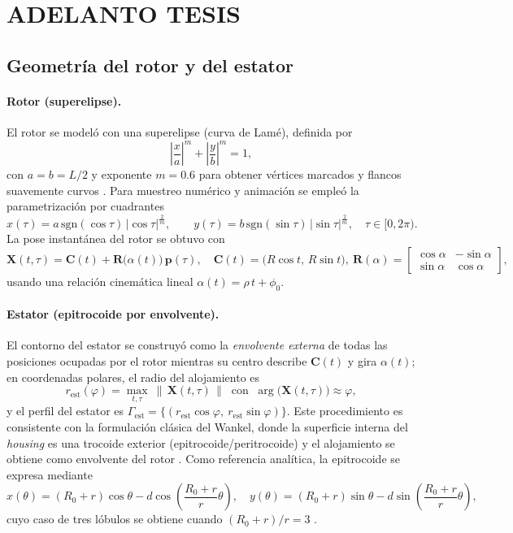 \documentclass{LS}
\begin{document}
\section{\bfseries\fontsize{10}{12}\selectfont ADELANTO TESIS  }\label{sec:intro}

\subsection{Geometría del rotor y del estator}

\paragraph{Rotor (superelipse).}
El rotor se modeló con una superelipse (curva de Lamé), definida por
\[
\left|\frac{x}{a}\right|^{m}+\left|\frac{y}{b}\right|^{m}=1,
\]
con $a=b=L/2$ y exponente $m=0.6$ para obtener vértices marcados y flancos suavemente curvos \citep{Huang2020,Lame1818}. Para muestreo numérico y animación se empleó la parametrización por cuadrantes
\[
x(\tau)=a\,\mathrm{sgn}(\cos\tau)\,|\cos\tau|^{\frac{2}{m}},\qquad
y(\tau)=b\,\mathrm{sgn}(\sin\tau)\,|\sin\tau|^{\frac{2}{m}},\quad \tau\in[0,2\pi).
\]
La pose instantánea del rotor se obtuvo con
\[
\mathbf{X}(t,\tau)=\mathbf{C}(t)+\mathbf{R}\big(\alpha(t)\big)\,\mathbf{p}(\tau),
\quad
\mathbf{C}(t)=\big(R\cos t,\,R\sin t\big),\ 
\mathbf{R}(\alpha)=\begin{bmatrix}\cos\alpha&-\sin\alpha\\ \sin\alpha&\cos\alpha\end{bmatrix},
\]
usando una relación cinemática lineal $\alpha(t)=\rho\,t+\phi_0$.

\paragraph{Estator (epitrocoide por envolvente).}
El contorno del estator se construyó como la \emph{envolvente externa} de todas las posiciones ocupadas por el rotor mientras su centro describe $\mathbf{C}(t)$ y gira $\alpha(t)$; en coordenadas polares, el radio del alojamiento es
\[
r_{\mathrm{est}}(\varphi)=\max_{t,\tau}\ \big\|\,\mathbf{X}(t,\tau)\,\big\|\ \text{ con }\ \arg\big(\mathbf{X}(t,\tau)\big)\approx \varphi,
\]
y el perfil del estator es $\Gamma_{\mathrm{est}}=\{(r_{\mathrm{est}}\cos\varphi,\ r_{\mathrm{est}}\sin\varphi)\}$.
Este procedimiento es consistente con la formulación clásica del Wankel, donde la superficie interna del \emph{housing} es una trocoide exterior (epitrocoide/peritrocoide) y el alojamiento se obtiene como envolvente del rotor \citep{Yamamoto1981}.
Como referencia analítica, la epitrocoide se expresa mediante
\[
x(\theta)=(R_0+r)\cos\theta-d\cos\!\left(\frac{R_0+r}{r}\theta\right),\quad
y(\theta)=(R_0+r)\sin\theta-d\sin\!\left(\frac{R_0+r}{r}\theta\right),
\]
cuyo caso de tres lóbulos se obtiene cuando $(R_0+r)/r=3$ \citep{MathWorldEpitrochoid}.
\end{document}
